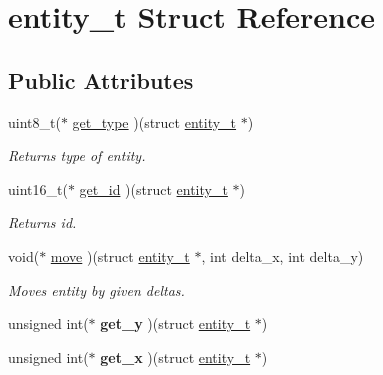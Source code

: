 \hypertarget{structentity__t}{}\section{entity\+\_\+t Struct Reference}
\label{structentity__t}
\subsection*{Public Attributes}
\begin{DoxyCompactItemize}
\item 
uint8\+\_\+t($\ast$ \hyperlink{structentity__t_a5c0cd2f37ea529b1dd3926c974c8dd91}{get\+\_\+type} )(struct \hyperlink{structentity__t}{entity\+\_\+t} $\ast$)\hypertarget{structentity__t_a5c0cd2f37ea529b1dd3926c974c8dd91}{}\label{structentity__t_a5c0cd2f37ea529b1dd3926c974c8dd91}

\begin{DoxyCompactList}\small\item\em Returns type of entity. \end{DoxyCompactList}\item 
uint16\+\_\+t($\ast$ \hyperlink{structentity__t_a2db9c6536f04180a055838b60bd11916}{get\+\_\+id} )(struct \hyperlink{structentity__t}{entity\+\_\+t} $\ast$)\hypertarget{structentity__t_a2db9c6536f04180a055838b60bd11916}{}\label{structentity__t_a2db9c6536f04180a055838b60bd11916}

\begin{DoxyCompactList}\small\item\em Returns id. \end{DoxyCompactList}\item 
void($\ast$ \hyperlink{structentity__t_ad3ae2c7318cb975482992546d8a21ca2}{move} )(struct \hyperlink{structentity__t}{entity\+\_\+t} $\ast$, int delta\+\_\+x, int delta\+\_\+y)\hypertarget{structentity__t_ad3ae2c7318cb975482992546d8a21ca2}{}\label{structentity__t_ad3ae2c7318cb975482992546d8a21ca2}

\begin{DoxyCompactList}\small\item\em Moves entity by given deltas. \end{DoxyCompactList}\item 
unsigned int($\ast$ {\bfseries get\+\_\+y} )(struct \hyperlink{structentity__t}{entity\+\_\+t} $\ast$)\hypertarget{structentity__t_a689d577da7faa9c6a829dfcfdb2c071d}{}\label{structentity__t_a689d577da7faa9c6a829dfcfdb2c071d}

\item 
unsigned int($\ast$ {\bfseries get\+\_\+x} )(struct \hyperlink{structentity__t}{entity\+\_\+t} $\ast$)\hypertarget{structentity__t_ae8517df7f16f29789666dbe3dead86ca}{}\label{structentity__t_ae8517df7f16f29789666dbe3dead86ca}


\end{DoxyCompactItemize}
